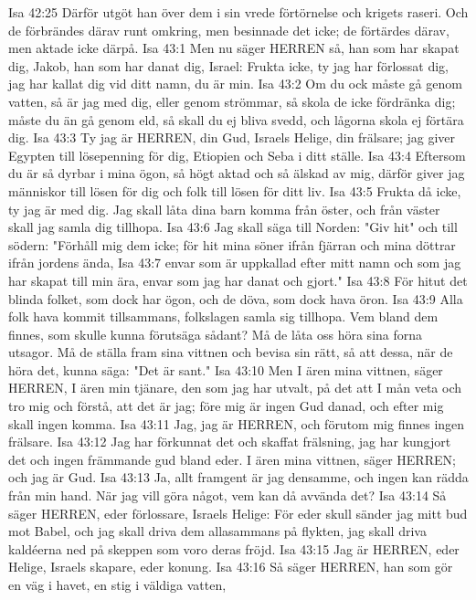 Isa 42:25  Därför utgöt han över dem i sin vrede förtörnelse och krigets raseri. Och de förbrändes därav runt omkring, men besinnade det icke; de förtärdes därav, men aktade icke därpå.
Isa 43:1  Men nu säger HERREN så, han som har skapat dig, Jakob, han som har danat dig, Israel: Frukta icke, ty jag har förlossat dig, jag har kallat dig vid ditt namn, du är min.
Isa 43:2  Om du ock måste gå genom vatten, så är jag med dig, eller genom strömmar, så skola de icke fördränka dig; måste du än gå genom eld, så skall du ej bliva svedd, och lågorna skola ej förtära dig.
Isa 43:3  Ty jag är HERREN, din Gud, Israels Helige, din frälsare; jag giver Egypten till lösepenning för dig, Etiopien och Seba i ditt ställe.
Isa 43:4  Eftersom du är så dyrbar i mina ögon, så högt aktad och så älskad av mig, därför giver jag människor till lösen för dig och folk till lösen för ditt liv.
Isa 43:5  Frukta då icke, ty jag är med dig. Jag skall låta dina barn komma från öster, och från väster skall jag samla dig tillhopa.
Isa 43:6  Jag skall säga till Norden: "Giv hit" och till södern: "Förhåll mig dem icke; för hit mina söner ifrån fjärran och mina döttrar ifrån jordens ända,
Isa 43:7  envar som är uppkallad efter mitt namn och som jag har skapat till min ära, envar som jag har danat och gjort."
Isa 43:8  För hitut det blinda folket, som dock har ögon, och de döva, som dock hava öron.
Isa 43:9  Alla folk hava kommit tillsammans, folkslagen samla sig tillhopa. Vem bland dem finnes, som skulle kunna förutsäga sådant? Må de låta oss höra sina forna utsagor. Må de ställa fram sina vittnen och bevisa sin rätt, så att dessa, när de höra det, kunna säga: "Det är sant."
Isa 43:10  Men I ären mina vittnen, säger HERREN, I ären min tjänare, den som jag har utvalt, på det att I mån veta och tro mig och förstå, att det är jag; före mig är ingen Gud danad, och efter mig skall ingen komma.
Isa 43:11  Jag, jag är HERREN, och förutom mig finnes ingen frälsare.
Isa 43:12  Jag har förkunnat det och skaffat frälsning, jag har kungjort det och ingen främmande gud bland eder. I ären mina vittnen, säger HERREN; och jag är Gud.
Isa 43:13  Ja, allt framgent är jag densamme, och ingen kan rädda från min hand. När jag vill göra något, vem kan då avvända det?
Isa 43:14  Så säger HERREN, eder förlossare, Israels Helige: För eder skull sänder jag mitt bud mot Babel, och jag skall driva dem allasammans på flykten, jag skall driva kaldéerna ned på skeppen som voro deras fröjd.
Isa 43:15  Jag är HERREN, eder Helige, Israels skapare, eder konung.
Isa 43:16  Så säger HERREN, han som gör en väg i havet, en stig i väldiga vatten,
